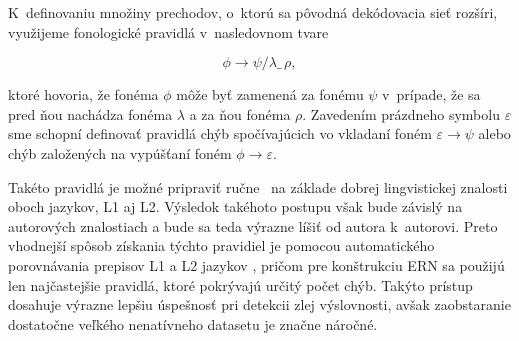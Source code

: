 K~definovaniu množiny prechodov, o~ktorú sa pôvodná dekódovacia sieť rozšíri, využijeme fonologické pravidlá v~nasledovnom tvare 

\begin{equation}
    \phi \rightarrow \psi / \lambda \_ \, \rho,
\end{equation}

\noindent ktoré hovoria, že fonéma $\phi$ môže byť zamenená za fonému $\psi$ v~prípade, že sa pred ňou nachádza fonéma $\lambda$ a za ňou fonéma $\rho$. Zavedením prázdneho symbolu $\varepsilon$ sme schopní definovať pravidlá chýb spočívajúcich vo vkladaní foném $\varepsilon \rightarrow \psi$ alebo chýb založených na vypúšťaní foném $\phi \rightarrow \varepsilon$. 

Takéto pravidlá je možné pripraviť ručne \cite{Harrison2009} na základe dobrej lingvistickej znalosti oboch jazykov, L1 aj L2. Výsledok takéhoto postupu však bude závislý na autorových znalostiach a bude sa teda výrazne líšiť od autora k~autorovi. Preto vhodnejší spôsob získania týchto pravidiel je pomocou automatického porovnávania prepisov L1 a L2 jazykov \cite{Lo2010}, pričom pre konštrukciu ERN sa použijú  len najčastejšie pravidlá, ktoré pokrývajú určitý počet chýb. Takýto prístup dosahuje výrazne lepšiu úspešnosť pri detekcii zlej výslovnosti, avšak zaobstaranie dostatočne veľkého nenatívneho datasetu je značne náročné.




